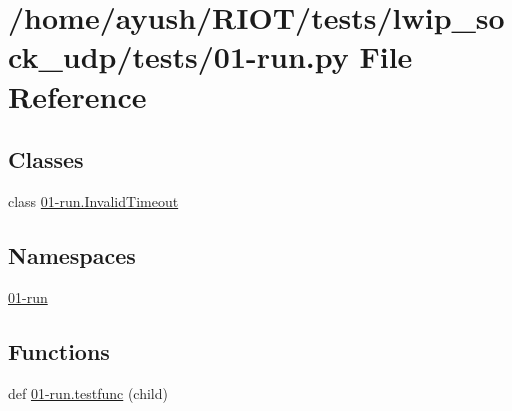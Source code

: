\hypertarget{lwip__sock__udp_2tests_201-run_8py}{}\section{/home/ayush/\+R\+I\+O\+T/tests/lwip\+\_\+sock\+\_\+udp/tests/01-\/run.py File Reference}
\label{lwip__sock__udp_2tests_201-run_8py}
\subsection*{Classes}
\begin{DoxyCompactItemize}
\item 
class \hyperlink{class01-run_1_1InvalidTimeout}{01-\/run.\+Invalid\+Timeout}
\end{DoxyCompactItemize}
\subsection*{Namespaces}
\begin{DoxyCompactItemize}
\item 
 \hyperlink{namespace01-run}{01-\/run}
\end{DoxyCompactItemize}
\subsection*{Functions}
\begin{DoxyCompactItemize}
\item 
def \hyperlink{namespace01-run_aff983ffd4ab0e6bf8e7e58970e4a10bb}{01-\/run.\+testfunc} (child)
\end{DoxyCompactItemize}
